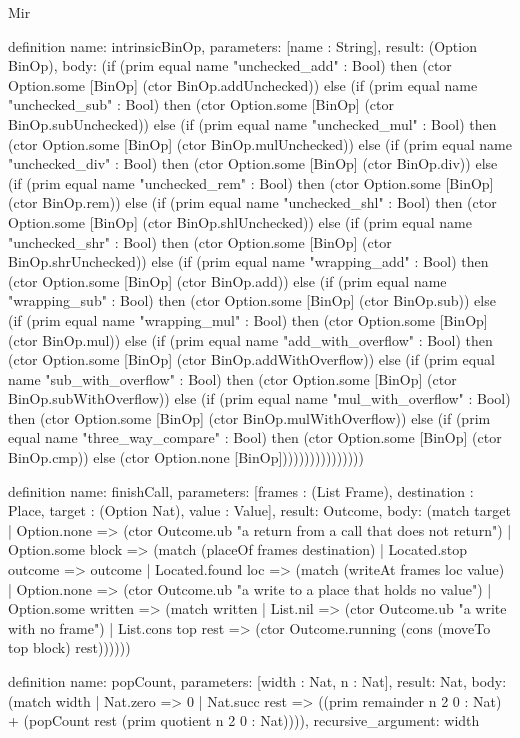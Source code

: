 \begin{lexlean}{Mir}
\begin{semanticmodule}
definition{
  name: intrinsicBinOp,
  parameters: [name : String],
  result: (Option BinOp),
  body: (if (prim equal name "unchecked_add" : Bool) then (ctor Option.some [BinOp] (ctor BinOp.addUnchecked)) else (if (prim equal name "unchecked_sub" : Bool) then (ctor Option.some [BinOp] (ctor BinOp.subUnchecked)) else (if (prim equal name "unchecked_mul" : Bool) then (ctor Option.some [BinOp] (ctor BinOp.mulUnchecked)) else (if (prim equal name "unchecked_div" : Bool) then (ctor Option.some [BinOp] (ctor BinOp.div)) else (if (prim equal name "unchecked_rem" : Bool) then (ctor Option.some [BinOp] (ctor BinOp.rem)) else (if (prim equal name "unchecked_shl" : Bool) then (ctor Option.some [BinOp] (ctor BinOp.shlUnchecked)) else (if (prim equal name "unchecked_shr" : Bool) then (ctor Option.some [BinOp] (ctor BinOp.shrUnchecked)) else (if (prim equal name "wrapping_add" : Bool) then (ctor Option.some [BinOp] (ctor BinOp.add)) else (if (prim equal name "wrapping_sub" : Bool) then (ctor Option.some [BinOp] (ctor BinOp.sub)) else (if (prim equal name "wrapping_mul" : Bool) then (ctor Option.some [BinOp] (ctor BinOp.mul)) else (if (prim equal name "add_with_overflow" : Bool) then (ctor Option.some [BinOp] (ctor BinOp.addWithOverflow)) else (if (prim equal name "sub_with_overflow" : Bool) then (ctor Option.some [BinOp] (ctor BinOp.subWithOverflow)) else (if (prim equal name "mul_with_overflow" : Bool) then (ctor Option.some [BinOp] (ctor BinOp.mulWithOverflow)) else (if (prim equal name "three_way_compare" : Bool) then (ctor Option.some [BinOp] (ctor BinOp.cmp)) else (ctor Option.none [BinOp])))))))))))))))
}

definition{
  name: finishCall,
  parameters: [frames : (List Frame), destination : Place, target : (Option Nat), value : Value],
  result: Outcome,
  body: (match target
    | Option.none => (ctor Outcome.ub "a return from a call that does not return")
    | Option.some block => (match (placeOf frames destination)
      | Located.stop outcome => outcome
      | Located.found loc => (match (writeAt frames loc value)
        | Option.none => (ctor Outcome.ub "a write to a place that holds no value")
        | Option.some written => (match written
          | List.nil => (ctor Outcome.ub "a write with no frame")
          | List.cons top rest => (ctor Outcome.running (cons (moveTo top block) rest))))))
}

definition{
  name: popCount,
  parameters: [width : Nat, n : Nat],
  result: Nat,
  body: (match width
    | Nat.zero => 0
    | Nat.succ rest => ((prim remainder n 2 0 : Nat) + (popCount rest (prim quotient n 2 0 : Nat)))),
  recursive_argument: width
}


\end{semanticmodule}
\end{lexlean}
